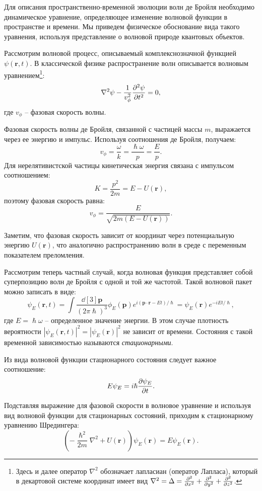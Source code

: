 \documentclass[a4paper, 12pt]{article}
\begin{document}
Для описания пространственно-временной эволюции волн де Бройля необходимо динамическое уравнение, определяющее изменение волновой функции в пространстве и времени. Мы приведем физическое обоснование вида такого уравнения, используя представление о волновой природе квантовых объектов.

Рассмотрим волновой процесс, описываемый комплекснозначной функцией
$\psi(\bm{r}, t)$. В классической физике распространение волн описывается волновым
уравнением\footnote{Здесь и далее оператор $\nabla^2$ обозначает лапласиан (оператор Лапласа),
  который в декартовой системе координат имеет вид $\nabla^2 = \Delta = \pdv[2]{x} + \pdv[2]{y} + \pdv[2]{z}$.}:
\[
\nabla^2 \psi - \frac{1}{v^2_{\phi}} \pdv[2]{\psi}{t} = 0,
\]
где $v_{\phi}$ -- фазовая скорость волны.

Фазовая скорость волны де Бройля, связанной с частицей массы $m$, выражается через ее энергию и импульс. Используя соотношения де Бройля, получаем:
\[
v_{\phi} = \frac{\omega}{k} = \frac{\hslash\omega}{p} = \frac{E}{p}.
\]
Для нерелятивистской частицы кинетическая энергия связана с импульсом соотношением:
\[
K = \frac{p^2}{2m} = E - U(\bm{r}),
\]
поэтому фазовая скорость равна:
\[
v_{\phi} = \frac{E}{\sqrt{2m(E - U(\bm{r}))}}.
\]

Заметим, что фазовая скорость зависит от координат через потенциальную энергию $U(\bm{r})$, что аналогично распространению волн в среде с переменным показателем преломления.

Рассмотрим теперь частный случай, когда волновая функция представляет собой суперпозицию волн де Бройля с одной и той же частотой. Такой волновой пакет можно записать в виде:
\[
\psi_E(\bm{r}, t) = \int \frac{\dd[3]{\bm{p}}}{(2\pi\hslash)^3} \phi_E(\bm{p}) e^{i(\bm{p}\cdot\bm{r} - Et)/\hslash} = \psi_E(\bm{r}) e^{-iEt/\hslash},
\]
где $E = \hslash\omega$ -- определенное значение энергии. В этом случае плотность вероятности $|\psi_E(\bm{r}, t)|^2 = |\psi_E(\bm{r})|^2$ не зависит от времени. Состояния с такой временной зависимостью называются \emph{стационарными}.

Из вида волновой функции стационарного состояния следует важное соотношение:
\begin{equation}
E\psi_E = i\hslash \pdv{\psi_E}{t}.
\end{equation}

Подставляя выражение для фазовой скорости в волновое уравнение и используя вид волновой функции для стационарных состояний, приходим к стационарному уравнению Шредингера:
\begin{equation}
\left( -\frac{\hslash^2}{2m} \nabla^2 + U(\bm{r}) \right) \psi_E(\bm{r}) = E \psi_E(\bm{r}).
\end{equation}
\end{document}
